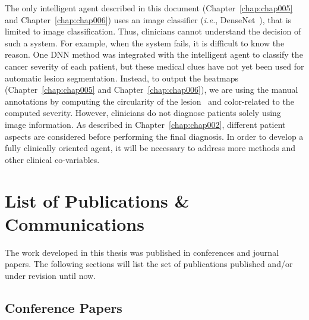 The only intelligent agent described in this document (Chapter~\ref{chap:chap005} and Chapter~\ref{chap:chap006}) uses an image classifier ({\it i.e.}, DenseNet~\cite{Huang_2017_CVPR}), that is limited to image classification.
Thus, clinicians cannot understand the decision of such a system.
For example, when the system fails, it is difficult to know the reason.
One \ac{DNN} method was integrated with the intelligent agent to classify the cancer severity of each patient, but these medical clues have not yet been used for automatic lesion segmentation.
Instead, to output the heatmaps (Chapter~\ref{chap:chap005} and Chapter~\ref{chap:chap006}), we are using the manual annotations by computing the circularity of the lesion~\cite{DALILA2017749} and color-related to the computed severity.
However, clinicians do not diagnose patients solely using image information.
As described in Chapter~\ref{chap:chap002}, different patient aspects are considered before performing the final diagnosis.
In order to develop a fully clinically oriented agent, it will be necessary to address more methods and other clinical co-variables.

\clearpage

\section{List of Publications \& Communications}
\label{sec:chap001006}

The work developed in this thesis was published in conferences and journal papers. The following sections will list the set of publications published and/or under revision until now.

\subsection{Conference Papers}
\label{sec:chap00100601}


